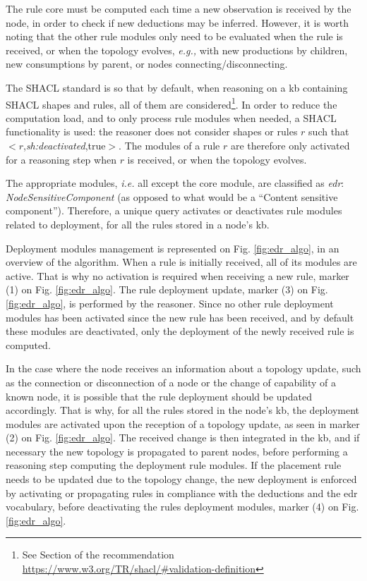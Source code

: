 \documentclass{iosart2c}
\newcommand{\namespace}[1]{\textit{#1$:$}}
\newcommand{\concept}[2]{\namespace{#1}\-\textit{#2}}
\newcommand{\triplet}[3]{$<$#1,\textit{#2},#3$>$}
\begin{document}
The rule core must be computed each time a new observation is received by the node, in order to check if new deductions may be inferred.
However, it is worth noting that the other rule modules only need to be evaluated when the rule is received, or when the topology evolves, \textit{e.g.,} with new productions by children, new consumptions by parent, or nodes connecting/disconnecting.

The SHACL standard is so that by default, when reasoning on a \gls{kb} containing SHACL shapes and rules, all of them are considered\footnote{See Section  of the recommendation \url{https://www.w3.org/TR/shacl/\#validation-definition}}.
In order to reduce the computation load, and to only process rule modules when needed, a SHACL functionality is used: the reasoner does not consider shapes or rules $r$ such that \triplet{$r$}{sh:deactivated}{true}.
The modules of a rule $r$ are therefore only activated for a reasoning step when $r$ is received, or when the topology evolves.

The appropriate modules, \textit{i.e.} all except the core module, are classified as \concept{edr}{Node\-Sensitive\-Component} (as opposed to what would be a ``Content sensitive component'').
Therefore, a unique query activates or deactivates rule modules related to deployment, for all the rules stored in a node's \gls{kb}.

Deployment modules management is represented on Fig. \ref{fig:edr_algo}, in an overview of the algorithm.
When a rule is initially received, all of its modules are active. 
That is why no activation is required when receiving a new rule, marker (1) on Fig. \ref{fig:edr_algo}. 
The rule deployment update, marker (3) on Fig. \ref{fig:edr_algo}, is performed by the reasoner.
Since no other rule deployment modules has been activated since the new rule has been received, and by default these modules are deactivated, only the deployment of the newly received rule is computed.

In the case where the node receives an information about a topology update, such as the connection or disconnection of a node or the change of capability of a known node, it is possible that the rule deployment should be updated accordingly.
That is why, for all the rules stored in the node's \gls{kb}, the deployment modules are activated upon the reception of a topology update, as seen in marker (2) on Fig. \ref{fig:edr_algo}.
The received change is then integrated in the \gls{kb}, and if necessary the new topology is propagated to parent nodes, before performing a reasoning step computing the deployment rule modules.
If the placement rule needs to be updated due to the topology change, the new deployment is enforced by activating or propagating rules in compliance with the deductions and the \gls{edr} vocabulary, before deactivating the rules deployment modules, marker (4) on Fig. \ref{fig:edr_algo}.
\end{document}
